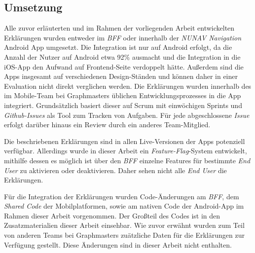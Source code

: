 \subsection{Umsetzung}

Alle zuvor erläuterten und im Rahmen der vorliegenden Arbeit entwickelten Erklärungen wurden entweder im \textit{BFF} oder innerhalb der \textit{NUNAV Navigation} Android App umgesetzt. Die Integration ist nur auf Android erfolgt, da die Anzahl der Nutzer auf Android etwa 92\% ausmacht und die Integration in die iOS-App den Aufwand auf Frontend-Seite verdoppelt hätte. Außerdem sind die Apps insgesamt auf verschiedenen Design-Ständen und können daher in einer Evaluation nicht direkt verglichen werden. Die Erklärungen wurden innerhalb des im Mobile-Team bei Graphmasters üblichen Entwicklungsprozesses in die App integriert. Grundsätzlich basiert dieser auf Scrum mit einwöchigen Sprints und \textit{Github-Issues} als Tool zum Tracken von Aufgaben. Für jede abgeschlossene \textit{Issue} erfolgt darüber hinaus ein Review durch ein anderes Team-Mitglied.

Die beschriebenen Erklärungen sind in allen Live-Versionen der Apps potenziell verfügbar. Allerdings wurde in dieser Arbeit ein \textit{Feature-Flag}-System entwickelt, mithilfe dessen es möglich ist über den \textit{BFF} einzelne Features für bestimmte \textit{End User} zu aktivieren oder deaktivieren. Daher sehen nicht alle \textit{End User} die Erklärungen.

Für die Integration der Erklärungen wurden Code-Änderungen am \textit{BFF}, dem \textit{Shared Code} der Mobilplatformen, sowie am nativen Code der Android-App im Rahmen dieser Arbeit vorgenommen. Der Großteil des Codes ist in den Zusatzmaterialien dieser Arbeit einsehbar. Wie zuvor erwähnt wurden zum Teil von anderen Teams bei Graphmasters zuätzliche Daten für die Erklärungen zur Verfügung gestellt. Diese Änderungen sind in dieser Arbeit nicht enthalten.

\newpage